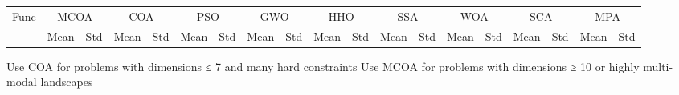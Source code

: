 \begin{tabular}{lrrrrrrrrrrrrrrrrrr}
\hline
Func & \multicolumn{2}{c}{MCOA} & \multicolumn{2}{c}{COA} & \multicolumn{2}{c}{PSO} & \multicolumn{2}{c}{GWO} & \multicolumn{2}{c}{HHO} & \multicolumn{2}{c}{SSA} & \multicolumn{2}{c}{WOA} & \multicolumn{2}{c}{SCA} & \multicolumn{2}{c}{MPA} \\
 & Mean & Std & Mean & Std & Mean & Std & Mean & Std & Mean & Std & Mean & Std & Mean & Std & Mean & Std & Mean & Std \\
\hline
\hline
\end{tabular}
Use COA for problems with dimensions ≤ 7 and many hard constraints
Use MCOA for problems with dimensions ≥ 10 or highly multi-modal landscapes